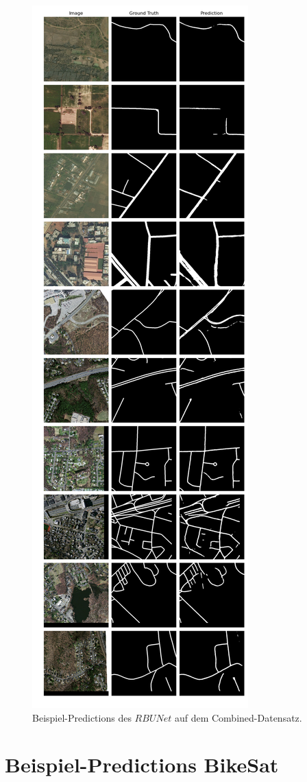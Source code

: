 \begin{figure}
	\centering
	\includegraphics[width=.41\textwidth]{Bilder/Samples-Combined/rbunet.png}
	\caption{Beispiel-Predictions des $RBUNet$ auf dem Combined-Datensatz.}
	\label{fig:combined-samples-rbunet}
\end{figure}



\pagebreak 



\section{Beispiel-Predictions BikeSat} \label{sec:pred-bikesat}

